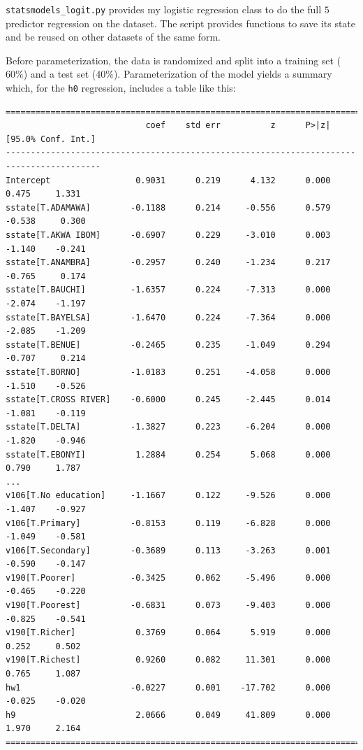 \documentclass[prl,onecolumn,amsmath,amssymb,superscriptaddress,notitlepage]{revtex4-1}
\begin{document}
\verb|statsmodels_logit.py| provides my logistic regression class to do the full $5$ predictor regression on the dataset. The script provides functions to save its state and be reused on other datasets of the same form. 

Before parameterization, the data is randomized and split into a training set ($60\%$) and a test set ($40\%$). Parameterization of the model yields a summary which, for the \verb|h0| regression, includes a table like this:
\begin{verbatim}                 
=========================================================================================
                            coef    std err          z      P>|z|      [95.0% Conf. Int.]
-----------------------------------------------------------------------------------------
Intercept                 0.9031      0.219      4.132      0.000         0.475     1.331
sstate[T.ADAMAWA]        -0.1188      0.214     -0.556      0.579        -0.538     0.300
sstate[T.AKWA IBOM]      -0.6907      0.229     -3.010      0.003        -1.140    -0.241
sstate[T.ANAMBRA]        -0.2957      0.240     -1.234      0.217        -0.765     0.174
sstate[T.BAUCHI]         -1.6357      0.224     -7.313      0.000        -2.074    -1.197
sstate[T.BAYELSA]        -1.6470      0.224     -7.364      0.000        -2.085    -1.209
sstate[T.BENUE]          -0.2465      0.235     -1.049      0.294        -0.707     0.214
sstate[T.BORNO]          -1.0183      0.251     -4.058      0.000        -1.510    -0.526
sstate[T.CROSS RIVER]    -0.6000      0.245     -2.445      0.014        -1.081    -0.119
sstate[T.DELTA]          -1.3827      0.223     -6.204      0.000        -1.820    -0.946
sstate[T.EBONYI]          1.2884      0.254      5.068      0.000         0.790     1.787
...
v106[T.No education]     -1.1667      0.122     -9.526      0.000        -1.407    -0.927
v106[T.Primary]          -0.8153      0.119     -6.828      0.000        -1.049    -0.581
v106[T.Secondary]        -0.3689      0.113     -3.263      0.001        -0.590    -0.147
v190[T.Poorer]           -0.3425      0.062     -5.496      0.000        -0.465    -0.220
v190[T.Poorest]          -0.6831      0.073     -9.403      0.000        -0.825    -0.541
v190[T.Richer]            0.3769      0.064      5.919      0.000         0.252     0.502
v190[T.Richest]           0.9260      0.082     11.301      0.000         0.765     1.087
hw1                      -0.0227      0.001    -17.702      0.000        -0.025    -0.020
h9                        2.0666      0.049     41.809      0.000         1.970     2.164
=========================================================================================
\end{verbatim}
\end{document}
